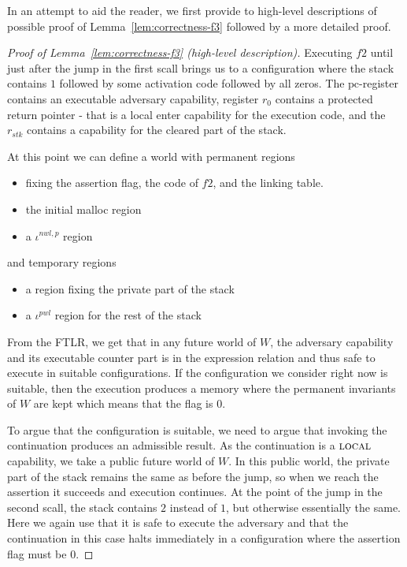 \documentclass[a4paper]{article}
\newcommand{\var}[1]{\mathit{#1}}
\newcommand{\pcreg}{\mathrm{pc}}
\newcommand{\stk}{\var{stk}}
\newcommand{\nwl}{\var{nwl}}
\newcommand{\pwl}{\var{pwl}}
\newcommand{\plainperm}[1]{\textsc{#1}}
\newcommand{\local}{\plainperm{local}}
\begin{document}
In an attempt to aid the reader, we first provide to high-level descriptions of possible proof of Lemma~\ref{lem:correctness-f3} followed by a more detailed proof.
\begin{proof}[Proof of Lemma~\ref{lem:correctness-f3} (high-level description)]
Executing $f2$ until just after the jump in the first scall brings us to a configuration where the stack contains $1$ followed by some activation code followed by all zeros. The $\pcreg$-register contains an executable adversary capability, register $r_0$ contains a protected return pointer - that is a local enter capability for the execution code, and the $r_\stk$ contains a capability for the cleared part of the stack.

At this point we can define a world with permanent regions
\begin{itemize}
\item fixing the assertion flag, the code of $f2$, and the linking table.
\item the initial malloc region
\item a $\iota^{\nwl,p}$ region
\end{itemize}
and temporary regions
\begin{itemize}
\item a region fixing the private part of the stack
\item a $\iota^\pwl$ region for the rest of the stack 
\end{itemize}
From the FTLR, we get that in any future world of $W$, the adversary capability and its executable counter part is in the expression relation and thus safe to execute in suitable configurations. If the configuration we consider right now is suitable, then the execution produces a memory where the permanent invariants of $W$ are kept which means that the flag is $0$.

To argue that the configuration is suitable, we need to argue that invoking the continuation produces an admissible result. As the continuation is a $\local$ capability, we take a public future world of $W$. In this public world, the private part of the stack remains the same as before the jump, so when we reach the assertion it succeeds and execution continues. At the point of the jump in the second scall, the stack contains $2$ instead of $1$, but otherwise essentially the same. Here we again use that it is safe to execute the adversary and that the continuation in this case halts immediately in a configuration where the assertion flag must be $0$.
\end{proof}
\end{document}
